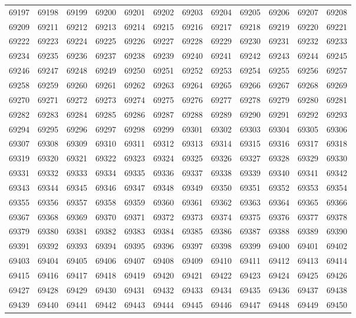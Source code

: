 \begin{center}
\begin{longtable}{llllllllllll}
69197 &69198 &69199 &69200 &69201 &69202 &69203 &69204 &69205 &69206 &69207 &69208 \\
69209 &69211 &69212 &69213 &69214 &69215 &69216 &69217 &69218 &69219 &69220 &69221 \\
69222 &69223 &69224 &69225 &69226 &69227 &69228 &69229 &69230 &69231 &69232 &69233 \\
69234 &69235 &69236 &69237 &69238 &69239 &69240 &69241 &69242 &69243 &69244 &69245 \\
69246 &69247 &69248 &69249 &69250 &69251 &69252 &69253 &69254 &69255 &69256 &69257 \\
69258 &69259 &69260 &69261 &69262 &69263 &69264 &69265 &69266 &69267 &69268 &69269 \\
69270 &69271 &69272 &69273 &69274 &69275 &69276 &69277 &69278 &69279 &69280 &69281 \\
69282 &69283 &69284 &69285 &69286 &69287 &69288 &69289 &69290 &69291 &69292 &69293 \\
69294 &69295 &69296 &69297 &69298 &69299 &69301 &69302 &69303 &69304 &69305 &69306 \\
69307 &69308 &69309 &69310 &69311 &69312 &69313 &69314 &69315 &69316 &69317 &69318 \\
69319 &69320 &69321 &69322 &69323 &69324 &69325 &69326 &69327 &69328 &69329 &69330 \\
69331 &69332 &69333 &69334 &69335 &69336 &69337 &69338 &69339 &69340 &69341 &69342 \\
69343 &69344 &69345 &69346 &69347 &69348 &69349 &69350 &69351 &69352 &69353 &69354 \\
69355 &69356 &69357 &69358 &69359 &69360 &69361 &69362 &69363 &69364 &69365 &69366 \\
69367 &69368 &69369 &69370 &69371 &69372 &69373 &69374 &69375 &69376 &69377 &69378 \\
69379 &69380 &69381 &69382 &69383 &69384 &69385 &69386 &69387 &69388 &69389 &69390 \\
69391 &69392 &69393 &69394 &69395 &69396 &69397 &69398 &69399 &69400 &69401 &69402 \\
69403 &69404 &69405 &69406 &69407 &69408 &69409 &69410 &69411 &69412 &69413 &69414 \\
69415 &69416 &69417 &69418 &69419 &69420 &69421 &69422 &69423 &69424 &69425 &69426 \\
69427 &69428 &69429 &69430 &69431 &69432 &69433 &69434 &69435 &69436 &69437 &69438 \\
69439 &69440 &69441 &69442 &69443 &69444 &69445 &69446 &69447 &69448 &69449 &69450 \\

\end{longtable}
\end{center}
